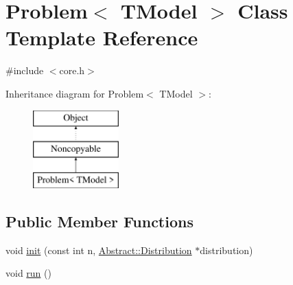 \hypertarget{classProblem}{}\section{Problem$<$ T\+Model $>$ Class Template Reference}
\label{classProblem}


{\ttfamily \#include $<$core.\+h$>$}

Inheritance diagram for Problem$<$ T\+Model $>$\+:\begin{figure}[H]
\begin{center}
\leavevmode
\includegraphics[height=3.000000cm]{classProblem}
\end{center}
\end{figure}
\subsection*{Public Member Functions}
\begin{DoxyCompactItemize}
\item 
void \hyperlink{classProblem_a27fca73edfbe372285fefc86f56d2718}{init} (const int n, \hyperlink{classAbstract_1_1Distribution}{Abstract\+::\+Distribution} $\ast$distribution)
\item 
void \hyperlink{classProblem_a8e9921afda2d764af0e04fe0e632f993}{run} ()
\end{DoxyCompactItemize}

